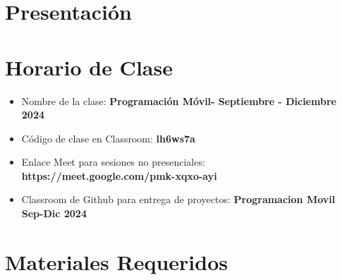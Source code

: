 \documentclass[aspectratio=169]{beamer}
\title[\abreviaturaNombreMateria]{\nombreMateria} %
\author{Dr. Marco Aurelio Nuño Maganda} %
\institute[UPV] %
{
Universidad Politecnica de Victoria \\ %
Ingenieria en Tecnologias de la Informacion \\ %
Cuatrimestre \cuatrimestre  \\ %
\medskip
\textit{mnunom@upv.edu.mx} %
}
\date{\today} %
\newcommand{\nombreMateria}{Programación Móvil}
\newcommand{\cuatrimestre}{Septiembre - Diciembre 2024}
\newcommand{\claveClassroom}{lh6ws7a}
\newcommand{\claveMeet}{https://meet.google.com/pmk-xqxo-ayi}
\begin{document}
\begin{frame}
\titlepage %
\end{frame}




\section{Presentación} 



\section{Horario de Clase}

%





\begin{frame}
\begin{itemize}
\frametitle{Plataforma Virtual para el Curso}
\item Nombre de la clase: \textbf{\nombreMateria - \cuatrimestre}
\item Código de clase en Classroom: \textbf{\claveClassroom}
\item Enlace Meet para sesiones no presenciales: \textbf{\claveMeet}
\item Classroom de Github para entrega de proyectos: \textbf{Programacion Movil Sep-Dic 2024}
\end{itemize}

\end{frame}












%




\section{Materiales Requeridos}
%

\end{document}
